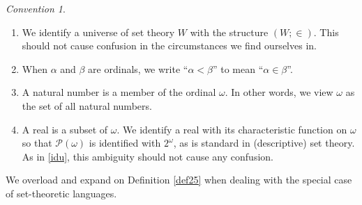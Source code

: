 \documentclass[12pt, twoside]{memoir}
\numberwithin{equation}{section}
\theoremstyle{definition}
\theoremstyle{remark}
\newtheorem{con}[thm]{Convention}
\theoremstyle{definition}
\theoremstyle{definition}
\theoremstyle{definition}
\theoremstyle{remark}
\begin{document}
\begin{con}
\begin{enumerate}[label=(\arabic*)]
    \item\label{idu} We identify a universe of set theory $W$ with the structure $(W; \in)$. This should not cause confusion in the circumstances we find ourselves in.
    \item When $\alpha$ and $\beta$ are ordinals, we write ``$\alpha < \beta$'' to mean ``$\alpha \in \beta$''.
    \item A natural number is a member of the ordinal $\omega$. In other words, we view $\omega$ as the set of all natural numbers.
    \item A real is a subset of $\omega$. We identify a real with its characteristic function on $\omega$ so that $\mathcal{P}(\omega)$ is identified with $2^{\omega}$, as is standard in (descriptive) set theory. As in \ref{idu}, this ambiguity should not cause any confusion.
\end{enumerate}
\end{con}

We overload and expand on Definition \ref{def25} when dealing with the special case of set-theoretic languages. 
\end{document}
